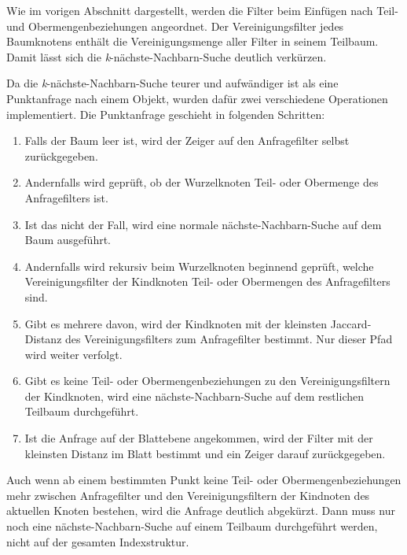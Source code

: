 Wie im vorigen Abschnitt dargestellt, werden die Filter beim Einfügen nach Teil- und Obermengenbeziehungen angeordnet. Der Vereinigungsfilter jedes Baumknotens enthält die Vereinigungsmenge aller Filter in seinem Teilbaum. Damit lässt sich die \textit{k}-nächste-Nachbarn-Suche deutlich verkürzen. 

Da die \textit{k}-nächste-Nachbarn-Suche teurer und aufwändiger ist als eine Punktanfrage nach einem Objekt, wurden dafür zwei verschiedene Operationen implementiert. Die Punktanfrage geschieht in folgenden Schritten: 
\begin{enumerate}
\setlength{\itemsep}{20pt}
	\item Falls der Baum leer ist, wird der Zeiger auf den Anfragefilter selbst zurückgegeben. 
	\item Andernfalls wird geprüft, ob der Wurzelknoten Teil- oder Obermenge des Anfragefilters ist. 
	\item Ist das nicht der Fall, wird eine normale nächste-Nachbarn-Suche auf dem Baum ausgeführt. 
	\item Andernfalls wird rekursiv beim Wurzelknoten beginnend geprüft, welche Vereinigungsfilter der Kindknoten Teil- oder Obermengen des Anfragefilters sind. 
	\item Gibt es mehrere davon, wird der Kindknoten mit der kleinsten Jaccard-Distanz des Vereinigungsfilters zum Anfragefilter bestimmt. Nur dieser Pfad wird weiter verfolgt.
	\item Gibt es keine Teil- oder Obermengenbeziehungen zu den Vereinigungsfiltern der Kindknoten, wird eine nächste-Nachbarn-Suche auf dem restlichen Teilbaum durchgeführt. 
	\item Ist die Anfrage auf der Blattebene angekommen, wird der Filter mit der kleinsten Distanz im Blatt bestimmt und ein Zeiger darauf zurückgegeben.  
\end{enumerate}
Auch wenn ab einem bestimmten Punkt keine Teil- oder Obermengenbeziehungen mehr zwischen Anfragefilter und den Vereinigungsfiltern der Kindnoten des aktuellen Knoten bestehen, wird die Anfrage deutlich abgekürzt. Dann muss nur noch eine nächste-Nachbarn-Suche auf einem Teilbaum durchgeführt werden, nicht auf der gesamten Indexstruktur. 


